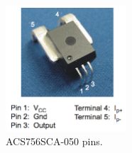 %
\begin{figure}[H]
	\begin{centering}
		\includegraphics[width=0.40\textwidth]{images/tb5_CS_photo.png}
		\caption{ACS756SCA-050 pins.}
	\end{centering}
\end{figure}
%
